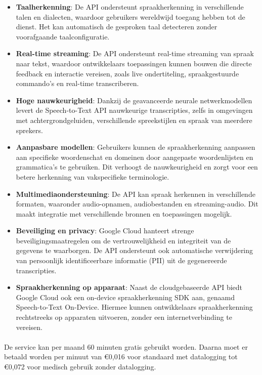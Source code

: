 \begin{itemize}
    \item \textbf{Taalherkenning}: De API ondersteunt spraakherkenning in verschillende talen en dialecten, waardoor gebruikers wereldwijd toegang hebben tot de dienst. Het kan automatisch de gesproken taal detecteren zonder voorafgaande taalconfiguratie.

    \item \textbf{Real-time streaming}: De API ondersteunt real-time streaming van spraak naar tekst, waardoor ontwikkelaars toepassingen kunnen bouwen die directe feedback en interactie vereisen, zoals live ondertiteling, spraakgestuurde commando's en real-time transcriberen.

    \item \textbf{Hoge nauwkeurigheid}: Dankzij de geavanceerde neurale netwerkmodellen levert de Speech-to-Text API nauwkeurige transcripties, zelfs in omgevingen met achtergrondgeluiden, verschillende spreekstijlen en spraak van meerdere sprekers.

    \item \textbf{Aanpasbare modellen}: Gebruikers kunnen de spraakherkenning aanpassen aan specifieke woordenschat en domeinen door aangepaste woordenlijsten en grammatica's te gebruiken. Dit verhoogt de nauwkeurigheid en zorgt voor een betere herkenning van vakspecifieke terminologie.

    \item \textbf{Multimediaondersteuning}: De API kan spraak herkennen in verschillende formaten, waaronder audio-opnamen, audiobestanden en streaming-audio. Dit maakt integratie met verschillende bronnen en toepassingen mogelijk.

    \item \textbf{Beveiliging en privacy}: Google Cloud hanteert strenge beveiligingsmaatregelen om de vertrouwelijkheid en integriteit van de gegevens te waarborgen. De API ondersteunt ook automatische verwijdering van persoonlijk identificeerbare informatie (PII) uit de gegenereerde transcripties.

    \item \textbf{Spraakherkenning op apparaat}: Naast de cloudgebaseerde API biedt Google Cloud ook een on-device spraakherkenning SDK aan, genaamd Speech-to-Text On-Device. Hiermee kunnen ontwikkelaars spraakherkenning rechtstreeks op apparaten uitvoeren, zonder een internetverbinding te vereisen.
\end{itemize}

\paragraph{}
De service kan per maand 60 minuten gratis gebruikt worden. Daarna moet er betaald worden per minuut van €0,016 voor standaard met datalogging tot €0,072 voor medisch gebruik zonder datalogging.

